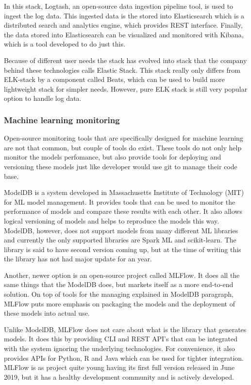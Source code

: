In this stack, Logtash, an open-source data ingestion pipeline tool, is used to ingest the log data.
This ingested data is the stored into Elasticsearch which is a distributed search and analytics engine, which provides REST interface.
Finally, the data stored into Elasticsearch can be visualized and monitored with Kibana, which is a tool developed to do just this. \cite{elastic}

Because of different user needs the stack has evolved into stack that the company behind these technologies calls Elastic Stack.
This stack really only differs from ELK-stack by a component called Beats, which can be used to build more lightweight stack for simpler needs.
However, pure ELK stack is still very popular option to handle log data. \cite{elastic}

\subsubsection{Machine learning monitoring}

Open-source monitoring tools that are specifically designed for machine learning are not that common, but couple of tools do exist.
These tools do not only help monitor the models perfomance, but also provide tools for deploying and versioning these models just like developer would use git to manage their code base.

ModelDB is a system developed in Massachusetts Institute of Technology (MIT) for ML model management.
It provides tools that can be used to monitor the performance of models and compare these results with each other.
It also allows logical versioning of models and helps to reproduce the models this way.
ModelDB, however, does not support models from many different ML libraries and currently the only supported libraries are Spark ML and scikit-learn.
The library is said to have second version coming up, but at the time of writing this the library has not had major update for an year.
\cite{modeldb}

Another, newer option is an open-source project called MLFlow.
It does all the same things that the ModelDB does, but markets itself as a more end-to-end solution.
On top of tools for the managing explained in ModelDB paragraph, MLFlow puts more emphasis on packaging the models and the deployment of these models into actual use.
\cite{mlflow}

Unlike ModelDB, MLFlow does not care about what is the library that generates models.
It does this by providing CLI and REST API's that can be integrated with the system ignoring the underlying technologies.
For convenience, it also provides APIs for Python, R and Java which can be used for tighter integration.
MLFlow is as project quite young having its first full version released in June 2019, but it has a healthy development community and is actively developed.
\cite{mlflow}